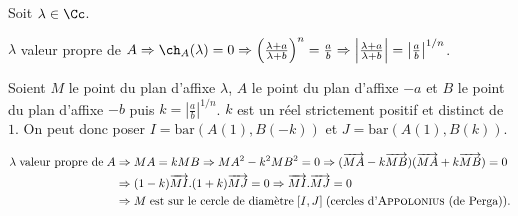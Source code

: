 {{Soit $\lambda\in\Cc$.

\begin{center}
$\lambda$ valeur propre de $A\Rightarrow \ch_A(\lambda) = 0\Rightarrow\left(\frac{\lambda+a}{\lambda+b}\right)^n=\frac{a}{b}\Rightarrow\left|\frac{\lambda+a}{\lambda+b}\right|=\left|\frac{a}{b}\right|^{1/n}$.
\end{center}

Soient $M$ le point du plan d'affixe $\lambda$, $A$ le point du plan d'affixe $-a$ et $B$ le point du plan d'affixe $-b$ puis $k =\left|\frac{a}{b}\right|^{1/n}$. $k$ est un réel strictement positif et distinct de $1$. On peut donc poser $I =\text{bar}(A(1),B(-k))$ et $J =\text{bar}(A(1),B(k))$.

\begin{align*}\ensuremath
\lambda\;\text{valeur propre de}\;A&\Rightarrow MA = kMB \Rightarrow MA^2 - k^2MB^2 = 0\Rightarrow (\overrightarrow{MA}-k\overrightarrow{MB})(\overrightarrow{MA}+k\overrightarrow{MB}) = 0\\ 
 &\Rightarrow(1-k)\overrightarrow{MI}.(1+k)\overrightarrow{MJ}= 0 \Rightarrow\overrightarrow{MI}.\overrightarrow{MJ}= 0\\
  &\Rightarrow M\;\text{est sur le cercle de diamètre}\;[I,J]\;(\text{cercles d'\textsc{Appolonius} (de Perga)}).
\end{align*}
}
}
